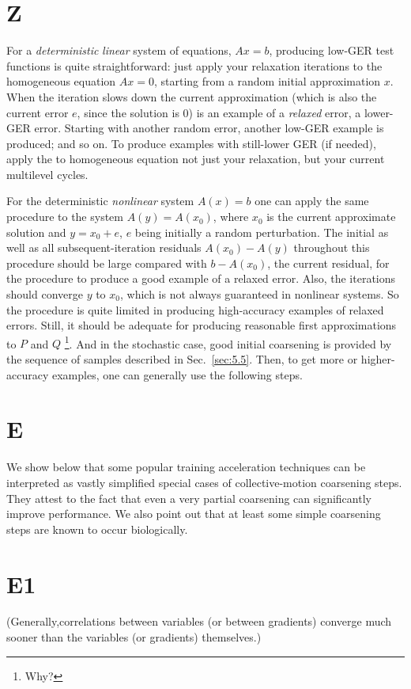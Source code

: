 \documentclass{article} %
\begin{document}
\section{Z}
For a {\it deterministic} {\it linear} system of equations, $Ax = b$, producing low-GER test functions is quite straightforward: just apply your relaxation iterations to the homogeneous equation $Ax = 0$, starting from a random initial approximation $x$. When the iteration slows down the current approximation (which is also the current error $e$, since the solution is $0$) is an example of a {\it relaxed} error, a lower-GER error. Starting with another random error, another low-GER example is produced; and so on. To produce examples with still-lower GER (if needed), apply the to homogeneous equation not just your relaxation, but your current multilevel cycles.

For the deterministic {\it nonlinear} system $A(x) = b$ one can apply the same procedure to the system $A(y) = A(x_0)$, where $x_0$ is the current approximate solution and $y = x_0 + e$, $e$ being initially a random perturbation. The initial as well as all subsequent-iteration residuals $A(x_0) - A(y)$  throughout this procedure should be large compared with $b - A(x_0)$, the current residual, for the procedure to produce a good example of a relaxed error. Also, the iterations should converge $y$ to $x_0$, which is not always guaranteed in nonlinear systems. So the procedure is quite limited in producing high-accuracy examples of relaxed errors. Still, it should be adequate for producing reasonable first approximations to $P$ and $Q$ \footnote{Why?}. And in the stochastic case, good initial coarsening is provided by the sequence of samples described in Sec.~\ref{sec:5.5}. Then, to get more or higher-accuracy examples, one can generally use the following steps.

\section{E}
We show below that some popular training acceleration techniques can be interpreted as vastly simplified special cases of collective-motion coarsening steps. They attest to the fact that even a very partial coarsening can significantly improve performance. We also point out that at least some simple coarsening steps are known to occur biologically.

\section{E1}
(Generally,correlations between variables (or between gradients) converge much sooner than the variables (or gradients) themselves.)
\end{document}
